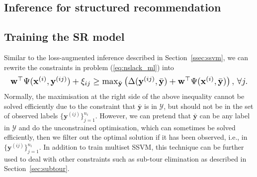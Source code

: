 
\subsection{Inference for structured recommendation}
\label{ssec:SRinf}



\subsection{Training the SR model}
\label{ssec:SRtrain}


Similar to the loss-augmented inference described in Section~\ref{ssec:ssvm}, 
we can rewrite the constraints in problem (\ref{eq:nslack_ml}) into
\begin{equation*}
\resizebox{0.99\linewidth}{!}
{$
\mathbf{w}^\top \Psi(\mathbf{x}^{(i)}, \mathbf{y}^{(ij)}) + \xi_{ij} \ge 
\max_{\bar{\mathbf{y}}} \left( \Delta(\mathbf{y}^{(ij)}, \bar{\mathbf{y}}) + \mathbf{w}^\top \Psi(\mathbf{x}^{(i)}, \bar{\mathbf{y}}) \right),
\, \forall j.
$}
\end{equation*} 
Normally, the maximisation at the right side of the above inequality cannot be solved efficiently due to the constraint that 
$\bar{\mathbf{y}}$ is in $\mathcal{Y}$,
but should not be in the set of observed labels $\{\mathbf{y}^{(ij)}\}_{j=1}^{n_i}$.
However, we can pretend that $\bar{\mathbf{y}}$ can be any label in $\mathcal{Y}$ and do the unconstrained optimisation,
which can sometimes be solved efficiently, then we filter out the optimal solution if it has been observed, 
i.e., in $\{\mathbf{y}^{(ij)}\}_{j=1}^{n_i}$. 
In addition to train multiset SSVM, this technique can be further used to deal with other constraints such as sub-tour elimination 
as described in Section~\ref{sec:subtour}.






